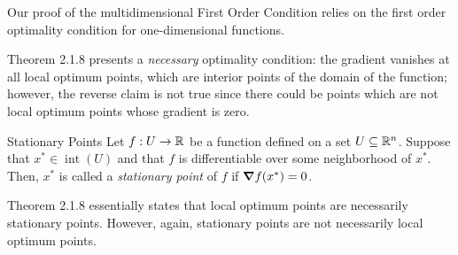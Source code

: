 \begin{rmk}
	Our proof of the multidimensional First Order Condition relies on the first order optimality condition for one-dimensional functions. 
\end{rmk}
\begin{rmk}
	Theorem 2.1.8 presents a \emph{necessary} optimality condition: the gradient vanishes at all local optimum points, which are interior points of the domain of the function; however, the reverse claim is not true since there could be points which are not local optimum points whose gradient is zero. 	
\end{rmk}
\begin{df}{Stationary Points}
	Let $f:U\to{\mathbb{R}}$ be a function defined on a set $U\subseteq{\mathbb{R}}^n$. Suppose that $x^*\in\operatorname{int}(U)$ and that $f$ is differentiable over some neighborhood of $x^*$. Then, $x^*$ is called a \textit{stationary point} of $f$ if $\grad f(x^*)=0$.
\end{df}
\begin{rmk}
	Theorem 2.1.8 essentially states that local optimum points are necessarily stationary points. However, again, stationary points are not necessarily local optimum points. 	
\end{rmk}

